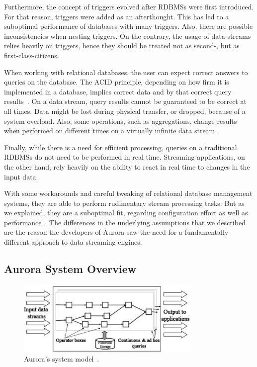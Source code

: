 Furthermore, the concept of triggers evolved after RDBMSs were first introduced. For that reason, triggers were added as an afterthought. This has led to a suboptimal performance of databases with many triggers. Also, there are possible inconsistencies when nesting triggers. On the contrary, the usage of data streams relies heavily on triggers, hence they should be treated not as second-, but as first-class-citizens.

When working with relational databases, the user can expect correct answers to queries on the database. The ACID principle, depending on how firm it is implemented in a database, implies correct data and by that correct query results~\cite{ACID}. On a data stream, query results cannot be guaranteed to be correct at all times. Data might be lost during physical transfer, or dropped, because of a system overload. Also, some operations, such as aggregations, change results when performed on different times on a virtually infinite data stream.

Finally, while there is a need for efficient processing, queries on a traditional RDBMSs do not need to be performed in real time. Streaming applications, on the other hand, rely heavily on the ability to react in real time to changes in the input data.

With some workarounds and careful tweaking of relational database management systems, they are able to perform rudimentary stream processing tasks. But as we explained, they are a suboptimal fit, regarding configuration effort as well as performance~\cite{RDBMSvsMapReduce}. The differences in the underlying assumptions that we described are the reason the developers of Aurora saw the need for a fundamentally different approach to data streaming engines.

\subsection{Aurora System Overview}\label{auroraOverview}

\begin{figure}[!t]
\centering
\includegraphics[width=3.5in]{./img/AuroraSystemModel.png}
\caption{Aurora's system model~\cite{Aurora2003}.}
\label{fig_aurora_system}
\end{figure}

